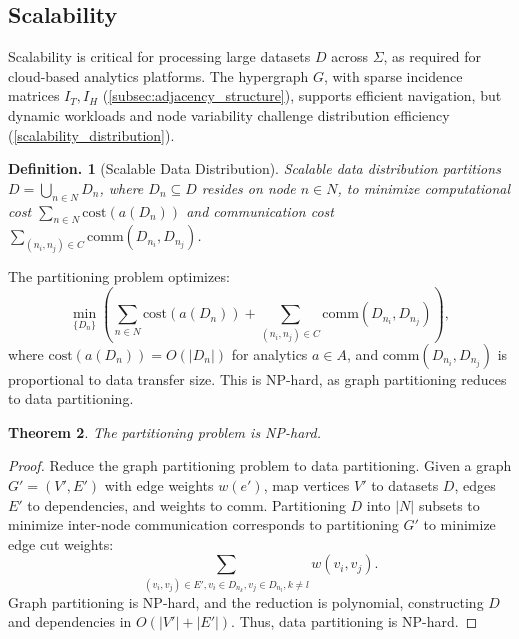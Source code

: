 \documentclass{amsart}
\newtheorem{thm}{Theorem}
\newtheorem{defn}[thm]{Definition.}
\begin{document}
\subsection{Scalability} \label{subsec:scalability}
Scalability is critical for processing large datasets \( D \) across \( \Sigma \), as required for cloud-based analytics platforms. The hypergraph \( G \), with sparse incidence matrices \( I_T, I_H \) (\cref{subsec:adjacency_structure}), supports efficient navigation, but dynamic workloads and node variability challenge distribution efficiency (\cref{scalability_distribution}).

\begin{defn}[Scalable Data Distribution]
Scalable data distribution partitions \( D = \bigcup_{n \in N} D_n \), where \( D_n \subseteq D \) resides on node \( n \in N \), to minimize computational cost \( \sum_{n \in N} \text{cost}(a(D_n)) \) and communication cost \( \sum_{(n_i, n_j) \in C} \text{comm}(D_{n_i}, D_{n_j}) \).
\end{defn}

The partitioning problem optimizes:
\[
\min_{\{D_n\}} \left( \sum_{n \in N} \text{cost}(a(D_n)) + \sum_{(n_i, n_j) \in C} \text{comm}(D_{n_i}, D_{n_j}) \right),
\]
where \( \text{cost}(a(D_n)) = O(|D_n|) \) for analytics \( a \in A \), and \( \text{comm}(D_{n_i}, D_{n_j}) \) is proportional to data transfer size. This is NP-hard, as graph partitioning reduces to data partitioning.

\begin{thm} \label{thm:partitioning_np_hard}
The partitioning problem is NP-hard.
\end{thm}

\begin{proof}
Reduce the graph partitioning problem to data partitioning. Given a graph \( G' = (V', E') \) with edge weights \( w(e') \), map vertices \( V' \) to datasets \( D \), edges \( E' \) to dependencies, and weights to \( \text{comm} \). Partitioning \( D \) into \( |N| \) subsets to minimize inter-node communication corresponds to partitioning \( G' \) to minimize edge cut weights:
\[
\sum_{(v_i, v_j) \in E', v_i \in D_{n_k}, v_j \in D_{n_l}, k \neq l} w(v_i, v_j).
\]
Graph partitioning is NP-hard, and the reduction is polynomial, constructing \( D \) and dependencies in \( O(|V'| + |E'|) \). Thus, data partitioning is NP-hard.
\end{proof}
\end{document}
